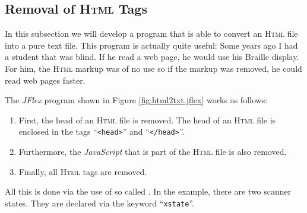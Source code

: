 \subsection{Removal of  \textsc{Html} Tags}
In this subsection we will develop a program that is able to convert an 
\textsc{Html} file into a pure text file.  This program is actually quite useful: Some years ago I
had a student that was blind.  If he read a web page, he would use his Braille display.  For him,
the \textsc{Html} markup was of no use so if the markup was removed, he could read web pages faster.

The \textsl{JFlex} program shown in Figure \ref{fig:html2txt.jflex} works as follows:
\begin{enumerate}
\item First, the head of an  \textsc{Html} file is removed.  The head of an \textsc{Html} file is
      enclosed in the  tags ``\texttt{<head>}'' and ``\texttt{</head>}''.
\item Furthermore, the \textsl{JavaScript} that is part of the \textsc{Html} file is also removed.
\item Finally, all  \textsc{Html} tags are removed.
\end{enumerate}
All this is done via the use of so called .  In the example, there are two
scanner states.  They are declared via the keyword
``\texttt{xstate}''. 

